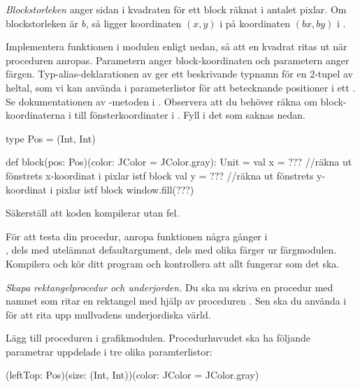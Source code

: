 \begin{framed}
\noindent \emph{Blockstorleken} anger sidan i kvadraten för ett block räknat i antalet pixlar. Om blockstorleken är $b$, så ligger koordinaten $(x, y)$ i  på koordinaten $(bx, by)$ i .

\end{framed}

\noindent Implementera funktionen  i modulen  enligt nedan, så att en kvadrat ritas ut när proceduren anropas. Parametern  anger block-koordinaten och parametern  anger färgen. Typ-alias-deklarationen av  ger ett beskrivande typnamn för en 2-tupel av heltal, som vi kan använda i parameterlistor för att betecknande positioner i ett . Se dokumentationen av -metoden i . Observera att du behöver räkna om block-koordinaterna i  till fönsterkoordinater i . Fyll i det som saknas nedan.
\begin{Code}
  type Pos = (Int, Int)

  def block(pos: Pos)(color: JColor = JColor.gray): Unit = {
    val x = ??? //räkna ut fönstrets x-koordinat i pixlar istf block
    val y = ??? //räkna ut fönstrets y-koordinat i pixlar istf block
    window.fill(???)
  }
\end{Code}
Säkerställ att koden kompilerar utan fel.


\Subtask
För att testa din procedur, anropa funktionen  några gånger i  \\, dels med utelämnat defaultargument, dels med olika färger ur färgmodulen. Kompilera och kör ditt program och kontrollera att allt fungerar som det ska.



\Task \emph{Skapa rektangelprocedur och underjorden.} Du ska nu skriva en procedur med namnet  som ritar en rektangel med hjälp av proceduren . Sen ska du använda  i  för att rita upp mullvadens underjordiska värld.

\Subtask
Lägg till proceduren  i grafikmodulen. Procedurhuvudet ska ha följande parametrar uppdelade i tre olika paramterlistor:
\begin{Code}
(leftTop: Pos)(size: (Int, Int))(color: JColor = JColor.gray)
\end{Code}


